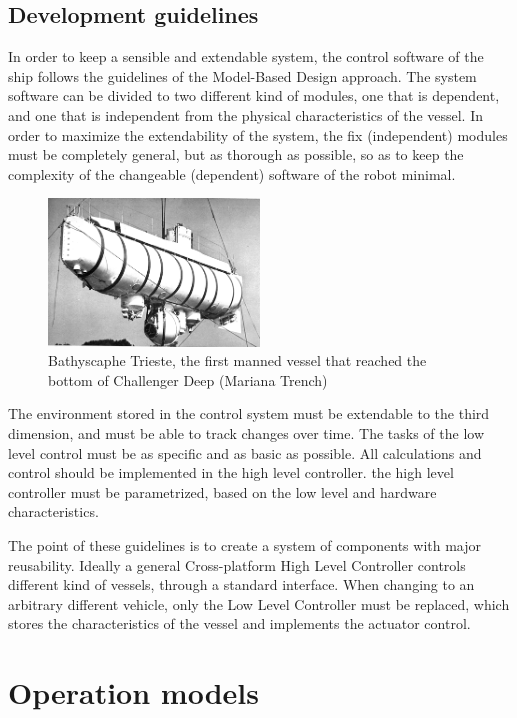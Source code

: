 \subsection*{Development guidelines}
In order to keep a sensible and extendable system, the control software of the ship follows the guidelines of the Model-Based Design approach. The system software can be divided to two different kind of modules, one that is dependent, and one that is independent from the physical characteristics of the vessel. In order to maximize the extendability of the system, the fix (independent) modules must be completely general, but as thorough as possible, so as to keep the complexity of the changeable (dependent) software of the robot minimal.
\begin{figure}
  \begin{center}
    \includegraphics[width=0.5\textwidth]{img/trieste}
  \end{center}
  \caption{Bathyscaphe Trieste, the first manned vessel that reached the bottom of Challenger Deep (Mariana Trench)\cite{trieste}}
\end{figure}

The environment stored in the control system must be extendable to the third dimension, and must be able to track changes over time.
The tasks of the low level control must be as specific and as basic as possible. All calculations and control should be implemented in the high level controller.
the high level controller must be parametrized, based on the low level and hardware characteristics.

The point of these guidelines is to create a system of components with major reusability. Ideally a general Cross-platform High Level Controller controls different kind of vessels, through a standard interface. When changing to an arbitrary different vehicle, only the Low Level Controller must be replaced, which stores the characteristics of the vessel and implements the actuator control.

\section*{Operation models}

